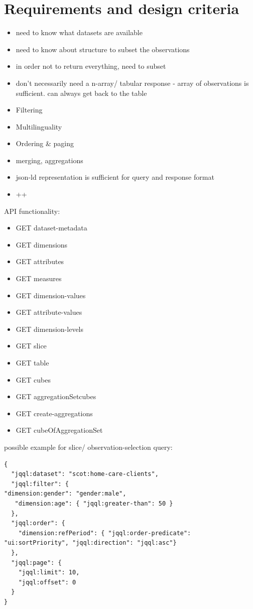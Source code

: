 \documentclass{llncs}
\begin{document}
\section{Requirements and design criteria}\label{sec:reqs}

\begin{itemize}
\item need to know what datasets are available
\item need to know about structure to subset the observations
\item in order not to return everything, need to subset
\item don't necessarily need a n-array/ tabular response - array of observations is sufficient. can always get back to the table
\item Filtering
\item Multilinguality
\item Ordering \& paging
\item merging, aggregations
\item json-ld representation is sufficient for query and response format
\item ++
\end{itemize}

API functionality:
\begin{itemize}
\item GET dataset-metadata
\item GET dimensions
\item GET attributes
\item GET measures
\item GET dimension-values
\item GET attribute-values
\item GET dimension-levels
\item GET slice
\item GET table
\item GET cubes
\item GET aggregationSetcubes
\item GET create-aggregations
\item GET cubeOfAggregationSet
\end{itemize}

\cite{Janssen:2012}

possible example for slice/ observation-selection query:
\begin{verbatim} 
{ 
  "jqql:dataset": "scot:home-care-clients",
  "jqql:filter": {
"dimension:gender": "gender:male",
   "dimension:age": { "jqql:greater-than": 50 }
  },
  "jqql:order": {
    "dimension:refPeriod": { "jqql:order-predicate": "ui:sortPriority", "jqql:direction": "jqql:asc"}
  },
  "jqql:page": {
    "jqql:limit": 10,
    "jqql:offset": 0
  }
}
\end{verbatim}
\end{document}
